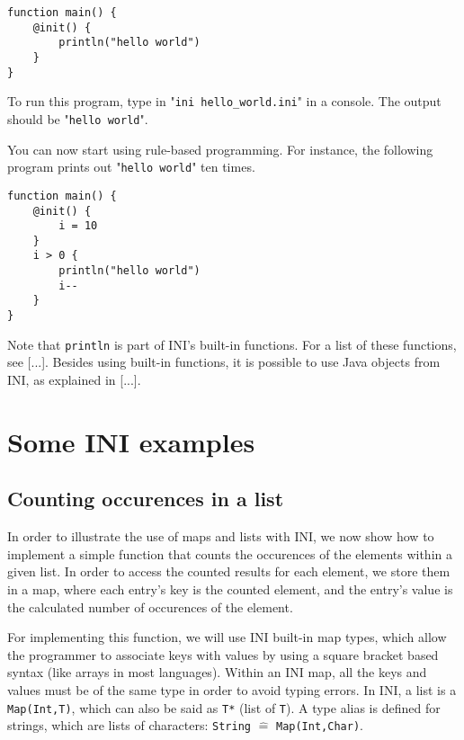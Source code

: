 \documentclass[11pt]{article}
\begin{document}
\begin{lstlisting}
function main() {
	@init() {
		println("hello world")
	}
}
\end{lstlisting}

To run this program, type in "\texttt{ini hello\_world.ini}" in a console. The output should be "\texttt{hello world}".

You can now start using rule-based programming. For instance, the following program prints out "\texttt{hello world}" ten times.

\begin{lstlisting}
function main() {
	@init() {
		i = 10
	}
	i > 0 {
		println("hello world")
		i--
	}
}
\end{lstlisting}

Note that \texttt{println} is part of INI's built-in functions. For a list of these functions, see [...]. Besides using built-in functions, it is possible to use Java objects from INI, as explained in [...].

\section{Some INI examples}

\subsection{Counting occurences in a list\label{sec:counting_occurences_in_a_list}}

In order to illustrate the use of maps and lists with INI, we now show how to implement a simple function that counts the occurences of the elements within a given list. In order to access the counted results for each element, we store them in a map, where each entry's key is the counted element, and the entry's value is the calculated number of occurences of the element.

For implementing this function, we will use INI built-in map types, which allow the programmer to associate keys with values by using a square bracket based syntax (like arrays in most languages). Within an INI map, all the keys and values must be of the same type in order to avoid typing errors. In INI, a list is a \texttt{Map(Int,T)}, which can also be said as \texttt{T*} (list of \texttt{T}). A type alias is defined for strings, which are lists of characters: \texttt{String} $\widehat=$ \texttt{Map(Int,Char)}.
\end{document}
